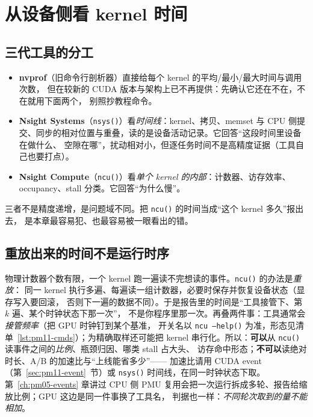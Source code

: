 \documentclass[12pt,a4paper,fontset=fandol]{ctexbook}
\newcommand{\Fn}[1]{\texttt{#1()}}
\begin{document}
\section{从设备侧看 kernel 时间}
\label{sec:pm11-device-side}

\subsection{三代工具的分工}
\label{sub:pm11-tools}

\begin{itemize}
  \item \textbf{nvprof}（旧命令行剖析器）直接给每个 kernel 的平均/最小/最大时间与调用次数，
        但在较新的 CUDA 版本与架构上已不再提供：先确认它还在不在，不在就用下面两个，
        别照抄教程命令。
  \item \textbf{Nsight Systems}（\Fn{nsys}）看\emph{时间线}：kernel、拷贝、memset 与
        CPU 侧提交、同步的相对位置与重叠，读的是设备活动记录。它回答``这段时间里设备在做什么、
        空隙在哪''，扰动相对小，但逐任务时间不是高精度证据（工具自己也要打点）。
  \item \textbf{Nsight Compute}（\Fn{ncu}）看\emph{单个 kernel 的内部}：计数器、访存效率、
        occupancy、stall 分类。它回答``为什么慢''。
\end{itemize}

三者不是精度递增，是问题域不同。把 \Fn{ncu} 的时间当成``这个 kernel 多久''报出去，
是本章最容易犯、也最容易被一眼看出的错。

\subsection{重放出来的时间不是运行时序}
\label{sub:pm11-replay}

物理计数器个数有限，一个 kernel 跑一遍读不完想读的事件。\Fn{ncu} 的办法是\emph{重放}：
同一 kernel 执行多遍、每遍读一组计数器，必要时保存并恢复设备状态（显存写入要回滚，
否则下一遍的数据不同）。于是报告里的时间是``工具接管下、第 $k$ 遍、某个时钟状态下那一次''，
不是你程序里那一次。再叠两件事：工具通常会\emph{接管频率}（把 GPU 时钟钉到某个基准，
开关名以 \Fn{ncu --help} 为准，形态见清单~\ref{lst:pm11-cmds}）；为精确取样还可能把 kernel
串行化。所以：\textbf{可以}从 \Fn{ncu} 读事件之间的\emph{比例}、瓶颈归因、哪类 stall 占大头、
访存命中形态；\textbf{不可以}读绝对时长、A/B 的加速比与``上线能省多少''——
加速比请用 CUDA event（第~\ref{sec:pm11-event}~节）或 \Fn{nsys} 时间线，在同一时钟状态下取。
第~\ref{ch:pm05-events} 章讲过 CPU 侧 PMU 复用会把一次运行拆成多轮、报告给缩放比例；GPU 这边是同一件事换了工具名，
判据也一样：\emph{不同轮次取到的量不能相加}。
\end{document}
